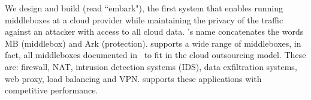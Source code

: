 %    
%    
% 
     
     
     
  
    We design and build \sys (read ``embark"), the first system that enables running middleboxes at a cloud provider while maintaining the privacy of the traffic against an attacker with access to all cloud data.  \sys's name concatenates the words MB (middlebox) and Ark (protection). \sys supports a wide range of middleboxes, in fact, all middleboxes documented in~\cite{aplomb} to fit in the cloud outsourcing model. These are: firewall, NAT, intrusion detection systems (IDS), data exfiltration systems, web proxy, load balancing and VPN. \sys supports these applications with competitive performance. 
    
